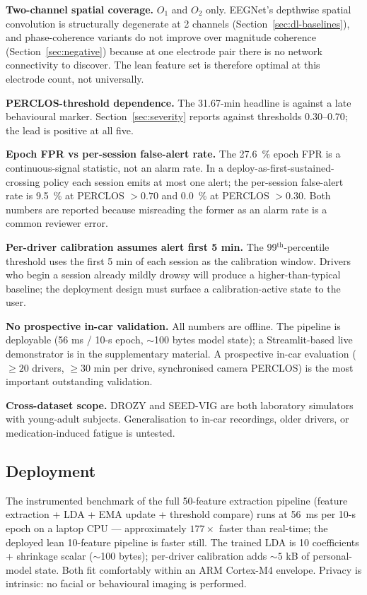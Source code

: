 \documentclass[journal]{IEEEtran}
\begin{document}
\textbf{Two-channel spatial coverage.} \(O_1\) and \(O_2\) only. EEGNet's depthwise spatial convolution is structurally degenerate at 2 channels (Section~\ref{sec:dl-baselines}), and phase-coherence variants do not improve over magnitude coherence (Section~\ref{sec:negative}) because at one electrode pair there is no network connectivity to discover. The lean feature set is therefore optimal at this electrode count, not universally.

\textbf{PERCLOS-threshold dependence.} The 31.67-min headline is against a late behavioural marker. Section~\ref{sec:severity} reports against thresholds 0.30--0.70; the lead is positive at all five.

\textbf{Epoch FPR vs per-session false-alert rate.} The 27.6~\% epoch FPR is a continuous-signal statistic, not an alarm rate. In a deploy-as-first-sustained-crossing policy each session emits at most one alert; the per-session false-alert rate is 9.5~\% at PERCLOS \(>0.70\) and 0.0~\% at PERCLOS \(>0.30\). Both numbers are reported because misreading the former as an alarm rate is a common reviewer error.

\textbf{Per-driver calibration assumes alert first 5 min.} The 99\(^\mathrm{th}\)-percentile threshold uses the first 5 min of each session as the calibration window. Drivers who begin a session already mildly drowsy will produce a higher-than-typical baseline; the deployment design must surface a calibration-active state to the user.

\textbf{No prospective in-car validation.} All numbers are offline. The pipeline is deployable (56 ms / 10-s epoch, \(\sim\)100 bytes model state); a Streamlit-based live demonstrator is in the supplementary material. A prospective in-car evaluation (\(\geq 20\) drivers, \(\geq 30\) min per drive, synchronised camera PERCLOS) is the most important outstanding validation.

\textbf{Cross-dataset scope.} DROZY and SEED-VIG are both laboratory simulators with young-adult subjects. Generalisation to in-car recordings, older drivers, or medication-induced fatigue is untested.

\subsection{Deployment}
The instrumented benchmark of the full 50-feature extraction pipeline (feature extraction + LDA + EMA update + threshold compare) runs at 56~ms per 10-s epoch on a laptop CPU --- approximately \(177 \times\) faster than real-time; the deployed lean 10-feature pipeline is faster still. The trained LDA is 10 coefficients + shrinkage scalar (\(\sim\)100 bytes); per-driver calibration adds \(\sim 5\) kB of personal-model state. Both fit comfortably within an ARM Cortex-M4 envelope. Privacy is intrinsic: no facial or behavioural imaging is performed.
\end{document}
